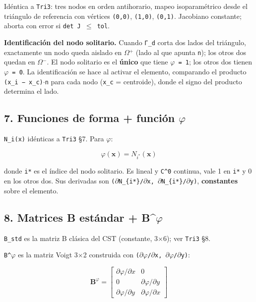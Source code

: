 \documentclass[11pt,letterpaper,oneside]{report}
\begin{document}
Idéntica a \texttt{Tri3}: tres nodos en orden antihorario, mapeo isoparamétrico desde el triángulo de referencia con vértices \texttt{(0,0)}, \texttt{(1,0)}, \texttt{(0,1)}. Jacobiano constante; aborta con error si \texttt{det J \ensuremath{\le} tol}.

\textbf{Identificación del nodo solitario.} Cuando \texttt{Γ\_d} corta dos lados del triángulo, exactamente un nodo queda aislado en \texttt{\ensuremath{\Omega}\ensuremath{^{+}}} (lado al que apunta \texttt{n}); los otros dos quedan en \texttt{\ensuremath{\Omega}\ensuremath{^{-}}}. El nodo solitario es el \textbf{único} que tiene \texttt{\ensuremath{\varphi} = 1}; los otros dos tienen \texttt{\ensuremath{\varphi} = 0}. La identificación se hace al activar el elemento, comparando el producto \texttt{(x\_i − x\_c)\ensuremath{\cdot}n} para cada nodo (\texttt{x\_c} = centroide), donde el signo del producto determina el lado.

\subsection{7. Funciones de forma + función \texttt{\ensuremath{\varphi}}}

\texttt{N\_i(x)} idénticas a \texttt{Tri3} §7. Para \texttt{\ensuremath{\varphi}}:

\[
\varphi(\mathbf x) = N_{i^*}(\mathbf x)
\]

donde \texttt{i*} es el índice del nodo solitario. Es lineal y \texttt{C\textasciicircum{}0} continua, vale 1 en \texttt{i*} y 0 en los otros dos. Sus derivadas son \texttt{(\ensuremath{\partial}N\_\{i*\}/\ensuremath{\partial}x, \ensuremath{\partial}N\_\{i*\}/\ensuremath{\partial}y)}, \textbf{constantes} sobre el elemento.

\subsection{8. Matrices B estándar + B\textasciicircum{}\ensuremath{\varphi}}

\texttt{B\_std} es la matriz B clásica del CST (constante, 3\ensuremath{\times}6); ver \texttt{Tri3} §8.

\texttt{B\textasciicircum{}\ensuremath{\varphi}} es la matriz Voigt 3\ensuremath{\times}2 construida con \texttt{(\ensuremath{\partial}\ensuremath{\varphi}/\ensuremath{\partial}x, \ensuremath{\partial}\ensuremath{\varphi}/\ensuremath{\partial}y)}:

\[
\mathbf B^\varphi = \begin{bmatrix} \partial\varphi/\partial x & 0 \\ 0 & \partial\varphi/\partial y \\ \partial\varphi/\partial y & \partial\varphi/\partial x \end{bmatrix}
\]
\end{document}
